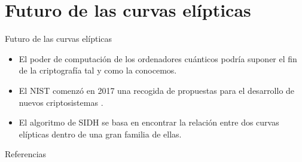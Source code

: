 \documentclass[spanish]{beamer}
\begin{document}
\section{Futuro de las curvas elípticas}
\begin{frame}[fragile]{Futuro de las curvas elípticas}
  \begin{itemize}
    \item El poder de computación de los ordenadores cuánticos podría suponer el fin de la criptografía tal y como la conocemos. %
    \item El NIST comenzó en 2017 una recogida de propuestas para el desarrollo de nuevos criptosistemas \parencite{computer_security_division_call_2017}. %
    \item El algoritmo de SIDH \parencite{yang_towards_2011} se basa en encontrar la relación entre dos curvas elípticas dentro de una gran familia de ellas.
    \end{itemize}
\end{frame}

\nocite{koblitz_elliptic_2011}
\nocite{elliptic_washington_2008}

\begin{frame}[t,allowframebreaks]{Referencias}
  \printbibliography[heading=none]
\end{frame}
\end{document}
